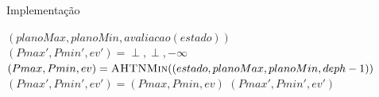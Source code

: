 \documentclass{beamer}
\begin{document}
\begin{frame}{Implementação}
	\vspace{5mm}
	{\footnotesize
	\begin{algorithmic}[1]		
		 \label{alg:meuahtn:terminal}
		\State	\Return $(planoMax, planoMin, avaliacao(estado))$
		\EndIf
		 \label{alg:meuahtn:nexaction}
		\State $(Pmax', Pmin', ev') = \perp, \perp, -\infty$
		 \label{alg:meuahtn:for}
		\State $(Pmax, Pmin, ev) = \Call{AHTNMin}{(estado, planoMax, planoMin, deph-1)}$ \label{alg:meuahtn:ahtnmin}
		 \label{alg:meuahtn:avali}
		\State $(Pmax', Pmin', ev') = (Pmax, Pmin, ev)$
		\EndIf		 		 		
		\EndFor
		\State \Return $(Pmax', Pmin', ev')$ \label{alg:meuahtn:retorno}
		\EndFunction
	\end{algorithmic}	
	}
\end{frame}
\end{document}
